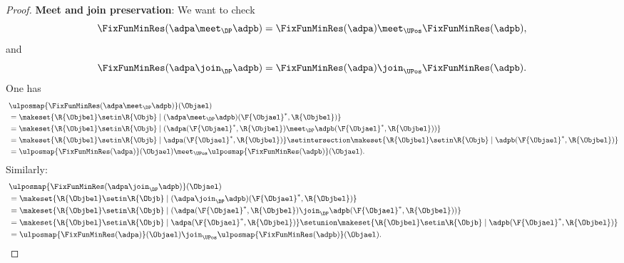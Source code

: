 \begin{proof}
    \textbf{Meet and join preservation}:
    We want to check
    \begin{equation}
        \FixFunMinRes(\adpa \meet_\DP \adpb)=\FixFunMinRes(\adpa) \meet_\UPos \FixFunMinRes(\adpb),
    \end{equation}
    and
    \begin{equation}
        \FixFunMinRes(\adpa \join_\DP \adpb)=\FixFunMinRes(\adpa) \join_\UPos \FixFunMinRes(\adpb).
    \end{equation}
    One has
    \begin{equation}
        \begin{aligned}
            ~ &
            \ulposmap{\FixFunMinRes(\adpa \meet_\DP \adpb)}(\Objael) \\
              & =\makeset{ \R{\Objbel} \setin \R{\Objb} \mid (\adpa \meet_\DP \adpb)(\F{\Objael}^*,\R{\Objbel})} \\
              & =\makeset{ \R{\Objbel} \setin \R{\Objb} \mid (\adpa(\F{\Objael}^*,\R{\Objbel})\meet_\DP \adpb(\F{\Objael}^*,\R{\Objbel}))} \\
              & =\makeset{ \R{\Objbel} \setin \R{\Objb} \mid \adpa(\F{\Objael}^*,\R{\Objbel})} \setintersection \makeset{ \R{\Objbel} \setin \R{\Objb} \mid  \adpb(\F{\Objael}^*,\R{\Objbel})} \\
              & =\ulposmap{\FixFunMinRes(\adpa)}(\Objael) \meet_\UPos \ulposmap{\FixFunMinRes(\adpb)}(\Objael).
        \end{aligned}
    \end{equation}
    Similarly:
    \begin{equation}
        \begin{aligned}
            ~ & \ulposmap{\FixFunMinRes(\adpa \join_\DP \adpb)}(\Objael) \\
              & =\makeset{ \R{\Objbel} \setin \R{\Objb} \mid (\adpa \join_\DP \adpb)(\F{\Objael}^*,\R{\Objbel})} \\
              & =\makeset{ \R{\Objbel} \setin \R{\Objb} \mid (\adpa(\F{\Objael}^*,\R{\Objbel})\join_\DP \adpb(\F{\Objael}^*,\R{\Objbel}))} \\
              & =\makeset{ \R{\Objbel} \setin \R{\Objb} \mid \adpa(\F{\Objael}^*,\R{\Objbel})} \setunion \makeset{ \R{\Objbel} \setin \R{\Objb} \mid  \adpb(\F{\Objael}^*,\R{\Objbel})} \\
              & =\ulposmap{\FixFunMinRes(\adpa)}(\Objael) \join_\UPos \ulposmap{\FixFunMinRes(\adpb)}(\Objael).
        \end{aligned}
    \end{equation}


\end{proof}
